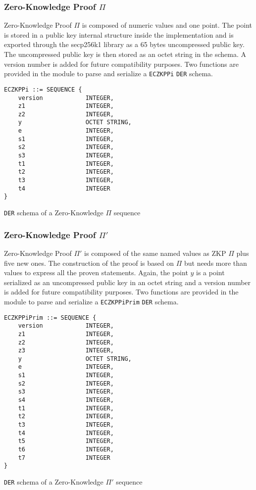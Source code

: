 \subsubsection{Zero-Knowledge Proof $\Pi$}

Zero-Knowledge Proof $\Pi$ is composed of numeric values and one point. The
point is stored in a public key internal structure inside the implementation and
is exported through the secp256k1 library as a 65 bytes uncompressed public key.
The uncompressed public key is then stored as an octet string in the schema. A
version number is added for future compatibility purposes. Two functions are
provided in the module to parse and serialize a \texttt{ECZKPPi} \texttt{DER}
schema.

\begin{listing}
  \begin{verbatim}
ECZKPPi ::= SEQUENCE {
    version            INTEGER,
    z1                 INTEGER,
    z2                 INTEGER,
    y                  OCTET STRING,
    e                  INTEGER,
    s1                 INTEGER,
    s2                 INTEGER,
    s3                 INTEGER,
    t1                 INTEGER,
    t2                 INTEGER,
    t3                 INTEGER,
    t4                 INTEGER
}
  \end{verbatim}
	\caption{\texttt{DER} schema of a Zero-Knowledge $\Pi$ sequence}
	\label{lst:DERSchemaZKPPi}
\end{listing}

\subsubsection{Zero-Knowledge Proof $\Pi'$}

Zero-Knowledge Proof $\Pi'$ is composed of the same named values as ZKP $\Pi$
plus five new ones. The construction of the proof is based on $\Pi$ but needs
more than values to express all the proven statements. Again, the point $y$ is a
point serialized as an uncompressed public key in an octet string and a version
number is added for future compatibility purposes. Two functions are provided in
the module to parse and serialize a \texttt{ECZKPPiPrim} \texttt{DER} schema.

\begin{listing}
  \begin{verbatim}
ECZKPPiPrim ::= SEQUENCE {
    version            INTEGER,
    z1                 INTEGER,
    z2                 INTEGER,
    z3                 INTEGER,
    y                  OCTET STRING,
    e                  INTEGER,
    s1                 INTEGER,
    s2                 INTEGER,
    s3                 INTEGER,
    s4                 INTEGER,
    t1                 INTEGER,
    t2                 INTEGER,
    t3                 INTEGER,
    t4                 INTEGER,
    t5                 INTEGER,
    t6                 INTEGER,
    t7                 INTEGER
}
  \end{verbatim}
	\caption{\texttt{DER} schema of a Zero-Knowledge $\Pi'$ sequence}
	\label{lst:DERSchemaZKPPi2}
\end{listing}

